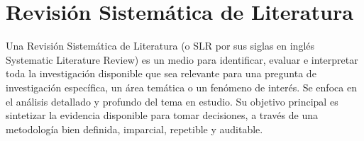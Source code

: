 \section{Revisión Sistemática de Literatura}
Una Revisión Sistemática de Literatura (o SLR por sus siglas en inglés Systematic Literature Review) es un medio para identificar, evaluar e interpretar toda la investigación disponible \cite{kitchenham2007guidelines}\cite{kitchenham2009slr} que sea relevante para una pregunta de investigación específica, un área temática o un fenómeno de interés. Se enfoca en el análisis detallado y profundo del tema en estudio. Su objetivo principal es sintetizar la evidencia disponible para tomar decisiones, a través de una metodología bien definida, imparcial, repetible y auditable. 